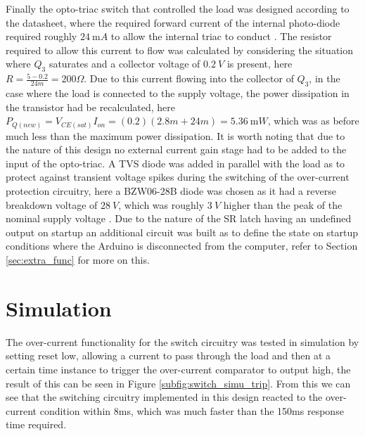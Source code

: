 \vspace{4mm} \newline 
Finally the opto-triac switch that controlled the load was designed according to the datasheet, where the required forward current of the internal photo-diode required roughly $\SI{24}{\milli A}$ to allow the internal triac to conduct \cite{MOC3020:2000}. The resistor required to allow this current to flow was calculated by considering the situation where $Q_3$ saturates and a collector voltage of $\SI{0.2}{V}$ is present, here $R=\frac{5-0.2}{24m}=200\Omega$. Due to this current flowing into the collector of $Q_3$, in the case where the load is connected to the supply voltage, the power dissipation in the transistor had be recalculated, here $P_{Q(new)}=V_{CE(sat)}I_{on}=(0.2)(2.8m+24m)=\SI{5.36}{\milli W}$, which was as before much less than the maximum power dissipation. It is worth noting that due to the nature of this design no external current gain stage had to be added to the input of the opto-triac.\vspace{4mm} \newline 
A TVS diode was added in parallel with the load as to protect against transient voltage spikes during the switching of the over-current protection circuitry, here a BZW06-28B diode was chosen as it had a reverse breakdown voltage of $\SI{28}{V}$, which was roughly $\SI{3}{V}$ higher than the peak of the nominal supply voltage \cite{BZW06:2016}.\vspace{4mm} \newline
Due to the nature of the SR latch having an undefined output on startup an additional circuit was built as to define the state on startup conditions where the Arduino is disconnected from the computer, refer to Section \ref{sec:extra_func} for more on this.

\section{Simulation} \label{sec:sw_simu}
The over-current functionality for the switch circuitry was tested in simulation by setting reset low, allowing a current to pass through the load and then at a certain time instance to trigger the over-current comparator to output high, the result of this can be seen in Figure \ref{subfig:switch_simu_trip}. From this we can see that the switching circuitry implemented in this design reacted to the over-current condition within 8ms, which was much faster than the 150ms response time required.

